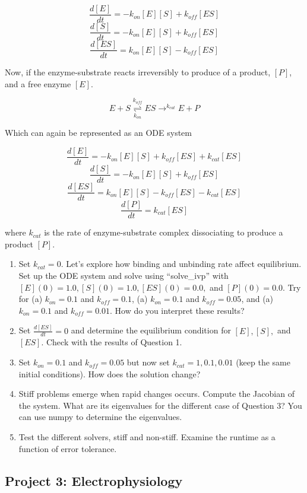 \documentclass[12pt]{article}
\begin{document}
$$\frac{d[E]}{dt}=-k_{on}[E][S]+k_{off}[ES]$$
$$\frac{d[S]}{dt}=-k_{on}[E][S]+k_{off}[ES]$$
$$\frac{d[ES]}{dt}=k_{on}[E][S]-k_{off}[ES]$$

Now, if the enzyme-substrate reacts irreversibly to produce of a product, $[P]$, and a free enzyme $[E]$.

$$E+S\underset{k_{on}}{\stackrel{k_{off}}{\rightleftharpoons}}ES\rightarrow^{k_{cat}}E+P$$

Which can again be represented as an ODE system


$$\frac{d[E]}{dt}=-k_{on}[E][S]+k_{off}[ES]+k_{cat}[ES]$$
$$\frac{d[S]}{dt}=-k_{on}[E][S]+k_{off}[ES]$$
$$\frac{d[ES]}{dt}=k_{on}[E][S]-k_{off}[ES]-k_{cat}[ES]$$
$$\frac{d[P]}{dt}=k_{cat}[ES]$$

where $k_{cat}$ is the rate of enzyme-substrate complex dissociating to produce a product $[P]$.

\begin{enumerate}
\item Set $k_{cat}=0$. Let's explore how binding and unbinding rate affect equilibrium. Set up the ODE system and solve using ``solve\_ivp'' with $[E](0)=1.0,[S](0)=1.0,[ES](0)=0.0,$ and $[P](0)=0.0$. Try for (a) $k_{on}=0.1$ and $k_{off}=0.1$, (a) $k_{on}=0.1$ and $k_{off}=0.05$, and (a) $k_{on}=0.1$ and $k_{off}=0.01$. How do you interpret these results?

\item Set $\frac{d[ES]}{dt}=0$ and determine the equilibrium condition for $[E],[S],$ and $[ES]$. Check with the results of Question 1.


\item Set $k_{on}=0.1$ and $k_{off}=0.05$ but now set $k_{cat}=1,0.1,0.01$ (keep the same initial conditions). How does the solution change?


\item Stiff problems emerge when rapid changes occurs. Compute the Jacobian of the system. What are its eigenvalues for the different case of Question 3?  You can use numpy to determine the eigenvalues.

\item Test the different solvers, stiff and non-stiff. Examine the runtime as a function of error tolerance.
\end{enumerate} 


\subsection{Project 3: Electrophysiology}
\end{document}
